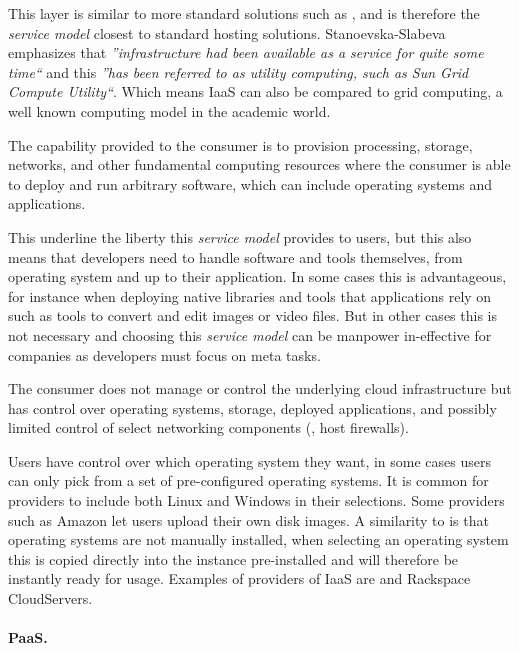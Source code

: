 This layer is similar to more standard solutions such as ,
and is therefore the \emph{service model} closest to standard hosting solutions.
Stanoevska-Slabeva~\cite{introduction:wozniak10} emphasizes that
\emph{''infrastructure had been available as a service for quite some time``} and this 
\emph{''has been referred to as utility computing, such as Sun Grid Compute Utility``}.
Which means IaaS can also be compared to grid computing, 
a well known computing model in the academic world.
\epigraph{The capability provided to the consumer is to provision 
  processing, storage, networks, and other fundamental computing resources where the 
  consumer is able to deploy and run arbitrary software, which can include operating 
  systems and applications.
}{}
This underline the liberty this \emph{service model} provides to users, but this also means
that developers need to handle software and tools themselves, from operating system and
up to their application. In some cases this is advantageous, for instance when deploying 
native libraries and tools that applications rely on such as tools to convert and edit
images or video files. But in other cases this is not necessary and choosing this \emph{service model}
can be manpower in-effective for companies as developers must focus on meta tasks.
\epigraph{The consumer does not manage or control the underlying cloud 
  infrastructure but has control over operating systems, storage, deployed applications, and 
  possibly limited control of select networking components (\eg, host firewalls).
}{}
Users have control over which operating system they want, in some cases users
can only pick from a set of pre-configured operating systems.
It is common for providers to include both Linux and Windows in their selections.
Some providers such as Amazon let users upload their own disk images.
A similarity to  is that operating systems are not manually installed,
when selecting an operating system this is copied directly into the instance pre-installed
and will therefore be instantly ready for usage.
Examples of providers of IaaS are   and Rackspace CloudServers.

\paragraph{PaaS.}

